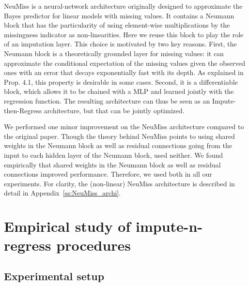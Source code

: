 \documentclass{article}
\theoremstyle{plain}
\begin{document}
NeuMiss \citep{LeMorvan2020NeuMiss} is a neural-network architecture originally designed to approximate the Bayes predictor for linear models with missing values. It contains a Neumann block that has the particularity of using element-wise multiplications by the missingness indicator as non-linearities. %
Here we reuse this block to play the role of an imputation layer. This choice is motivated by two key reasons. First, the Neumann block is a theoretically grounded layer for missing values: it can approximate the conditional expectation of the missing values given the observed ones with an error that decays exponentially fast with its depth. As explained in Prop. 4.1, this property is desirable in some cases. Second, it is a differentiable block, which allows it to be chained with a MLP and learned jointly with the regression function. The resulting architecture can thus be seen as an Impute-then-Regress architecture, but that can be jointly optimized.

We performed one minor improvement on the NeuMiss architecture compared to the original paper. Though the theory behind NeuMiss points to using shared weights in the Neumann block as well as residual connections going from the input to each hidden layer of the Neumann block, \citet{LeMorvan2020NeuMiss} used neither. We found empirically that shared weights in the Neumann block as well as residual connections improved performance. Therefore, we used both in all our experiments. %
For clarity, the (non-linear) NeuMiss architecture %
is described in detail in Appendix~\ref{ss:NeuMiss_archi}.

\section{Empirical study of impute-n-regress procedures}

\subsection{Experimental setup}\label{sec:experimental_setup}
\end{document}
